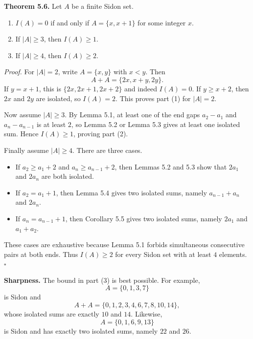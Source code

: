 \medskip
\noindent\textbf{Theorem 5.6.}
Let $A$ be a finite Sidon set.
\begin{enumerate}
\item $I(A)=0$ if and only if $A=\{x,x+1\}$ for some integer $x$.
\item If $|A|\ge 3$, then $I(A)\ge 1$.
\item If $|A|\ge 4$, then $I(A)\ge 2$.
\end{enumerate}

\smallskip
\noindent\emph{Proof.}
For $|A|=2$, write $A=\{x,y\}$ with $x<y$.
Then
\[
A+A=\{2x,x+y,2y\}.
\]
If $y=x+1$, this is $\{2x,2x+1,2x+2\}$ and indeed $I(A)=0$.
If $y\ge x+2$, then $2x$ and $2y$ are isolated, so $I(A)=2$.
This proves part (1) for $|A|=2$.

Now assume $|A|\ge 3$.  By Lemma 5.1, at least one of the end gaps $a_2-a_1$ and $a_n-a_{n-1}$ is at least $2$, so Lemma 5.2 or Lemma 5.3 gives at least one isolated sum.  Hence $I(A)\ge 1$, proving part (2).

Finally assume $|A|\ge 4$.  There are three cases.
\begin{itemize}
\item If $a_2\ge a_1+2$ and $a_n\ge a_{n-1}+2$, then Lemmas 5.2 and 5.3 show that $2a_1$ and $2a_n$ are both isolated.
\item If $a_2=a_1+1$, then Lemma 5.4 gives two isolated sums, namely $a_{n-1}+a_n$ and $2a_n$.
\item If $a_n=a_{n-1}+1$, then Corollary 5.5 gives two isolated sums, namely $2a_1$ and $a_1+a_2$.
\end{itemize}
These cases are exhaustive because Lemma 5.1 forbids simultaneous consecutive pairs at both ends.  Thus $I(A)\ge 2$ for every Sidon set with at least $4$ elements. \hfill$\square$

\medskip
\noindent\textbf{Sharpness.}
The bound in part (3) is best possible.  For example,
\[
A=\{0,1,3,7\}
\]
is Sidon and
\[
A+A=\{0,1,2,3,4,6,7,8,10,14\},
\]
whose isolated sums are exactly $10$ and $14$.  Likewise,
\[
A=\{0,1,6,9,13\}
\]
is Sidon and has exactly two isolated sums, namely $22$ and $26$.

